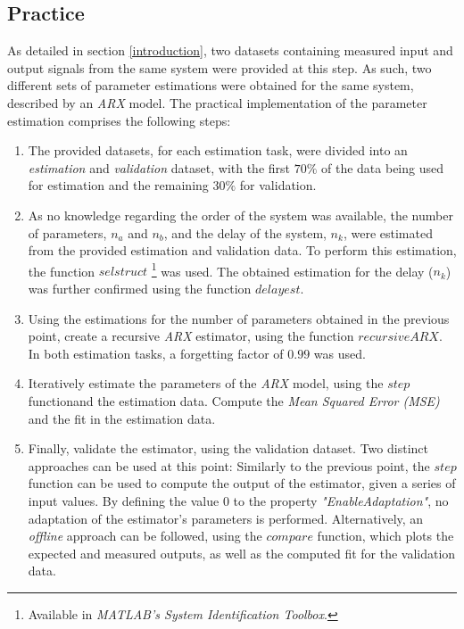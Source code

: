\documentclass[11pt]{article}
\begin{document}
\subsection{Practice}
\label{parameter_estimation_arx}

As detailed in section \ref{introduction}, two datasets containing measured input and output signals from the same system were provided at this step. As such, two different sets of parameter estimations were obtained for the same system, described by an \emph{ARX} model. The practical implementation of the parameter estimation comprises the following steps:

\begin{enumerate}
	\item The provided datasets, for each estimation task, were divided into an \emph{estimation} and \emph{validation} dataset, with the first $70\%$ of the data being used for estimation and the remaining $30\%$ for validation.
	
	\item As no knowledge regarding the order of the system was available, the number of parameters, $n_{a}$ and $n_{b}$, and the delay of the system, $n_{k}$, were estimated from the provided estimation and validation data. To perform this estimation, the function $selstruct$ \footnote{Available in \emph{MATLAB's System Identification Toolbox}.} was used. The obtained estimation for the delay ($n_{k}$) was further confirmed using the function $delayest$\footnotemark[\value{footnote}].
	
	\item Using the estimations for the number of parameters obtained in the previous point, create a recursive \emph{ARX} estimator, using the function $recursiveARX$\footnotemark[\value{footnote}]. In both estimation tasks, a forgetting factor of $0.99$ was used.
	
	\item Iteratively estimate the parameters of the \emph{ARX} model, using the $step$ function\footnotemark[\value{footnote}] and the estimation data. Compute the \emph{Mean Squared Error (MSE)} and the fit in the estimation data.
	
	\item Finally, validate the estimator, using the validation dataset. Two distinct approaches can be used at this point: Similarly to the previous point, the $step$ function can be used to compute the output of the estimator, given a series of input values. By defining the value $0$ to the property \emph{"EnableAdaptation"}, no adaptation of the estimator's parameters is performed. Alternatively, an \emph{offline} approach can be followed, using the $compare$ function\footnotemark[\value{footnote}], which plots the expected and measured outputs, as well as the computed fit for the validation data. 
\end{enumerate}
\end{document}
